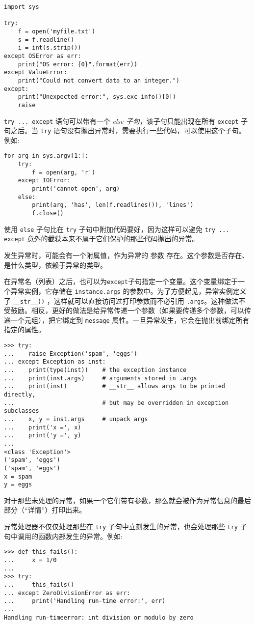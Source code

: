 \begin{lstlisting}
import sys

try:
    f = open('myfile.txt')
    s = f.readline()
    i = int(s.strip())
except OSError as err:
    print("OS error: {0}".format(err))
except ValueError:
    print("Could not convert data to an integer.")
except:
    print("Unexpected error:", sys.exc_info()[0])
    raise
\end{lstlisting}
\cprotect\texttt{try \verb|...| except} 语句可以带有一个 \textit{else 子句}，该子句只能出现在所有 \texttt{except} 子句之后。当 \texttt{try} 语句没有抛出异常时，需要执行一些代码，可以使用这个子句。例如:
\begin{lstlisting}
for arg in sys.argv[1:]:
    try:
        f = open(arg, 'r')
    except IOError:
        print('cannot open', arg)
    else:
        print(arg, 'has', len(f.readlines()), 'lines')
        f.close()
\end{lstlisting}
使用 \texttt{else} 子句比在 \texttt{try} 子句中附加代码要好，因为这样可以避免 \cprotect\texttt{try \verb|...| except} 意外的截获本来不属于它们保护的那些代码抛出的异常。

发生异常时，可能会有一个附属值，作为异常的 参数 存在。这个参数是否存在、是什么类型，依赖于异常的类型。

在异常名（列表）之后，也可以为\texttt{except}子句指定一个变量。这个变量绑定于一个异常实例，它存储在 \texttt{instance.args} 的参数中。为了方便起见，异常实例定义了 \verb|__str__()| ，这样就可以直接访问过打印参数而不必引用 \texttt{.args}。这种做法不受鼓励。相反，更好的做法是给异常传递一个参数（如果要传递多个参数，可以传递一个元组），把它绑定到 \texttt{message} 属性。一旦异常发生，它会在抛出前绑定所有指定的属性。
\begin{lstlisting}
>>> try:
...    raise Exception('spam', 'eggs')
... except Exception as inst:
...    print(type(inst))    # the exception instance
...    print(inst.args)     # arguments stored in .args
...    print(inst)          # __str__ allows args to be printed directly,
...                         # but may be overridden in exception subclasses
...    x, y = inst.args     # unpack args
...    print('x =', x)
...    print('y =', y)
...
<class 'Exception'>
('spam', 'eggs')
('spam', 'eggs')
x = spam
y = eggs
\end{lstlisting}
对于那些未处理的异常，如果一个它们带有参数，那么就会被作为异常信息的最后部分（“详情”）打印出来。

异常处理器不仅仅处理那些在 \texttt{try} 子句中立刻发生的异常，也会处理那些 \texttt{try} 子句中调用的函数内部发生的异常。例如:
\begin{lstlisting}
>>> def this_fails():
...     x = 1/0
...
>>> try:
...     this_fails()
... except ZeroDivisionError as err:
...     print('Handling run-time error:', err)
...
Handling run-timeerror: int division or modulo by zero
\end{lstlisting}
